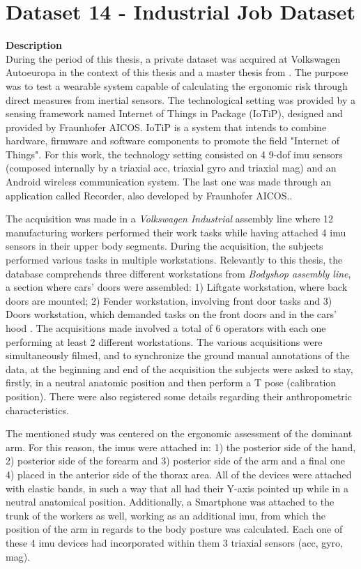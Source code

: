 \section{Dataset 14 - Industrial Job Dataset}
\label{sec:dataset_industry}
\textbf{Description}\hfill \\
During the period of this thesis, a private dataset was acquired at Volkswagen Autoeuropa in the context of this thesis and a master thesis from \cite{sara2019}. The purpose was to test a wearable system capable of calculating the ergonomic risk through direct measures from inertial sensors. The technological setting was provided by a sensing framework named Internet of Things in Package (IoTiP), designed and provided by Fraunhofer AICOS. IoTiP is a system that intends to combine hardware, firmware and software components to promote the field "Internet of Things"\cite{FraunhoferAICOS}. For this work, the technology setting consisted on 4 9-\gls{dof} \gls{imu} sensors (composed internally by a triaxial \gls{acc}, triaxial \gls{gyro} and triaxial \gls{mag}) and an Android wireless communication system. The last one was made through an application called Recorder, also developed by Fraunhofer AICOS.\cite{sara2019}.
\par
The acquisition was made in a \textit{Volkswagen Industrial} assembly line where 12 manufacturing workers performed their work tasks while having attached 4 \gls{imu} sensors in their upper body segments. During the acquisition, the subjects performed various tasks in multiple workstations. Relevantly to this thesis, the database comprehends three different workstations from \textit{Bodyshop assembly line}, a section where cars' doors were assembled: 1) Liftgate workstation, where back doors are mounted; 2) Fender workstation, involving front door tasks and 3) Doors workstation, which demanded tasks on the front doors and in the cars' hood \cite{sara2019}. The acquisitions made involved a total of 6 operators with each one performing at least 2 different workstations. The various acquisitions were simultaneously filmed, and to synchronize the ground manual annotations of the data, at the beginning and end of the acquisition the subjects were asked to stay, firstly, in a neutral anatomic position and then perform a T pose (calibration position). There were also registered some details regarding their anthropometric characteristics.
\par
The mentioned study was centered on the ergonomic assessment of the dominant arm. For this reason, the \gls{imu}s  were attached in: 1) the posterior side of the hand, 2) posterior side of the forearm and 3) posterior side of the arm and a final one 4) placed in the anterior side of the thorax area. All of the devices were attached with elastic bands, in such a way that all had their Y-axis pointed up while in a neutral anatomical position. Additionally, a Smartphone was attached to the trunk of the workers as well, working as an additional \gls{imu}, from which the position of the arm in regards to the body posture was calculated. Each one of these 4 \gls{imu} devices had incorporated within them 3 triaxial sensors (\gls{acc}, \gls{gyro}, \gls{mag}).\\
